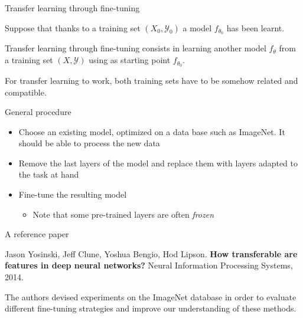 \documentclass[xcolor=pdftex,dvipsnames,table,mathserif]{beamer}
\begin{document}

\begin{frame}{Transfer learning through fine-tuning}

\begin{block}{}
  Suppose that thanks to a training set $(X_0, \mathcal{Y}_0)$ a model $f_{\theta_0}$ has been learnt.

  Transfer learning through fine-tuning consists in learning another model $f_{\theta}$ from a training set $(X, \mathcal{Y})$ using as starting point $f_{\theta_0}$.

  For transfer learning to work, both training sets have to be somehow related and compatible.
\end{block}

\end{frame}

\begin{frame}{General procedure}

  \begin{itemize}
  \item Choose an existing model, optimized on a data base such as ImageNet. It should be able to process the new data
  \item Remove the last layers of the model and replace them with layers adapted to the task at hand
  \item Fine-tune the resulting model

    \begin{itemize}
    \item Note that some pre-trained layers are often \emph{frozen}
    \end{itemize}
  \end{itemize}

\end{frame}

\begin{frame}{A reference paper \cite{yosinski_how_2014}}

\begin{block}{}
  Jason Yosinski, Jeff Clune, Yoshua Bengio, Hod Lipson. \textbf{How transferable are features in deep neural networks?} Neural Information Processing Systems, 2014.
\end{block}

The authors devised experiments on the ImageNet database in order to evaluate different fine-tuning strategies and improve our understanding of these methods.

\end{frame}
\end{document}
